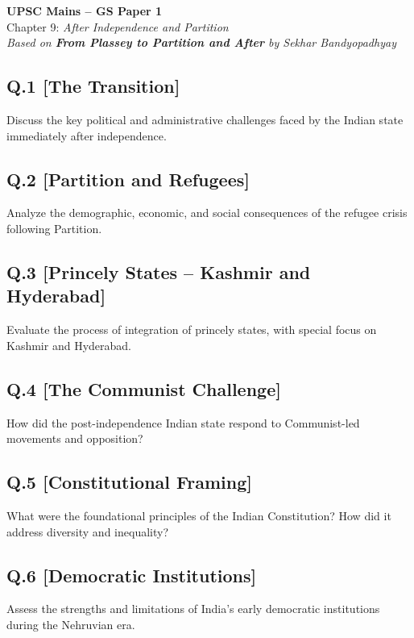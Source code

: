 \begin{center}
    \Large\textbf{UPSC Mains – GS Paper 1}\\
    \normalsize Chapter 9: \textit{After Independence and Partition}\\
    \vspace{0.5em}
    \textit{Based on \textbf{From Plassey to Partition and After} by Sekhar Bandyopadhyay}
\end{center}

\vspace{1em}

\subsection*{Q.1 [The Transition]}
Discuss the key political and administrative challenges faced by the Indian state immediately after independence.

\subsection*{Q.2 [Partition and Refugees]}
Analyze the demographic, economic, and social consequences of the refugee crisis following Partition.

\subsection*{Q.3 [Princely States – Kashmir and Hyderabad]}
Evaluate the process of integration of princely states, with special focus on Kashmir and Hyderabad.

\subsection*{Q.4 [The Communist Challenge]}
How did the post-independence Indian state respond to Communist-led movements and opposition?

\subsection*{Q.5 [Constitutional Framing]}
What were the foundational principles of the Indian Constitution? How did it address diversity and inequality?

\subsection*{Q.6 [Democratic Institutions]}
Assess the strengths and limitations of India's early democratic institutions during the Nehruvian era.

